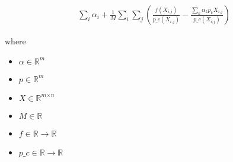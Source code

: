 \documentclass[12pt]{article}
\begin{document}
\begin{align*}
\sum_\textit{i} \textit{α}_{ \textit{i} } + \frac{1}{\textit{M}}\sum_\textit{i} \sum_\textit{j} \left( \frac{\textit{f}\left( \textit{X}_{\textit{i}, \textit{j}} \right)}{\textit{p\_c}\left( \textit{X}_{\textit{i}, \textit{j}} \right)} - \frac{\sum_\textit{k} \textit{α}_{ \textit{k} }\textit{p}_{ \textit{k} }\textit{X}_{\textit{i}, \textit{j}}}{\textit{p\_c}\left( \textit{X}_{\textit{i}, \textit{j}} \right)} \right)
\end{align*}

where
\begin{itemize}
\item $\textit{α} \in \mathbb{R}^{ \textit{m}}$
\item $\textit{p} \in \mathbb{R}^{ \textit{m}}$
\item $\textit{X} \in \mathbb{R}^{ \textit{m} \times \textit{n} }$
\item $\textit{M} \in \mathbb{{R}}$
\item $\textit{f} \in \mathbb{{R}}\rightarrow \mathbb{{R}}$
\item $\textit{p\_c} \in \mathbb{{R}}\rightarrow \mathbb{{R}}$
\end{itemize}
\end{document}
